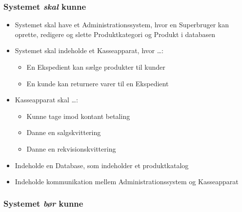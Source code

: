 \subsubsection*{Systemet \textit{skal} kunne}

\begin{itemize}

\item Systemet skal have et Administrationssystem, hvor en Superbruger kan oprette, redigere og slette Produktkategori og Produkt i databasen
\item Systemet skal indeholde et Kasseapparat, hvor …:
\begin{itemize}
\item En Ekspedient kan sælge produkter til kunder
\item En kunde kan returnere varer til en Ekspedient
\end{itemize}
\item Kasseapparat skal …:
\begin{itemize}
\item Kunne tage imod kontant betaling
\item Danne en salgskvittering
\item Danne en rekvisionskvittering
\end{itemize}
\item Indeholde en Database, som indeholder et produktkatalog
\item Indeholde kommunikation mellem Administrationssystem og Kasseapparat

\end{itemize}


\subsubsection*{Systemet \textit{bør} kunne}

